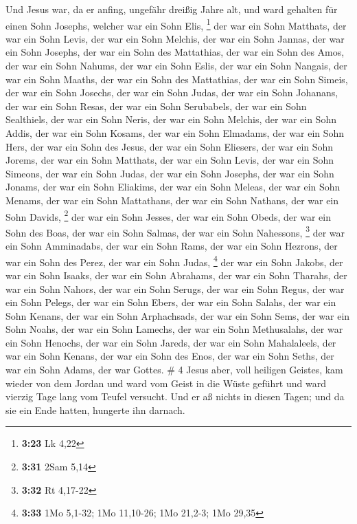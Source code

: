  Und Jesus war, da er anfing, ungefähr dreißig Jahre alt,
und ward gehalten für einen Sohn Josephs, welcher war ein Sohn Elis,
\footnote{\textbf{3:23} Lk 4,22}  der war ein Sohn
Matthats, der war ein Sohn Levis, der war ein Sohn Melchis, der war ein
Sohn Jannas, der war ein Sohn Josephs,  der war ein Sohn
des Mattathias, der war ein Sohn des Amos, der war ein Sohn Nahums, der
war ein Sohn Eslis, der war ein Sohn Nangais,  der war
ein Sohn Maaths, der war ein Sohn des Mattathias, der war ein Sohn
Simeis, der war ein Sohn Josechs, der war ein Sohn Judas,
 der war ein Sohn Johanans, der war ein Sohn Resas, der
war ein Sohn Serubabels, der war ein Sohn Sealthiels, der war ein Sohn
Neris,  der war ein Sohn Melchis, der war ein Sohn Addis,
der war ein Sohn Kosams, der war ein Sohn Elmadams, der war ein Sohn
Hers,  der war ein Sohn des Jesus, der war ein Sohn
Eliesers, der war ein Sohn Jorems, der war ein Sohn Matthats, der war
ein Sohn Levis,  der war ein Sohn Simeons, der war ein
Sohn Judas, der war ein Sohn Josephs, der war ein Sohn Jonams, der war
ein Sohn Eliakims,  der war ein Sohn Meleas, der war ein
Sohn Menams, der war ein Sohn Mattathans, der war ein Sohn Nathans, der
war ein Sohn Davids, \footnote{\textbf{3:31} 2Sam 5,14} 
der war ein Sohn Jesses, der war ein Sohn Obeds, der war ein Sohn des
Boas, der war ein Sohn Salmas, der war ein Sohn Nahessons, \footnote{\textbf{3:32}
  Rt 4,17-22}  der war ein Sohn Amminadabs, der war ein
Sohn Rams, der war ein Sohn Hezrons, der war ein Sohn des Perez, der war
ein Sohn Judas, \footnote{\textbf{3:33} 1Mo 5,1-32; 1Mo 11,10-26; 1Mo
  21,2-3; 1Mo 29,35}  der war ein Sohn Jakobs, der war
ein Sohn Isaaks, der war ein Sohn Abrahams, der war ein Sohn Tharahs,
der war ein Sohn Nahors,  der war ein Sohn Serugs, der
war ein Sohn Regus, der war ein Sohn Pelegs, der war ein Sohn Ebers, der
war ein Sohn Salahs,  der war ein Sohn Kenans, der war
ein Sohn Arphachsads, der war ein Sohn Sems, der war ein Sohn Noahs, der
war ein Sohn Lamechs,  der war ein Sohn Methusalahs, der
war ein Sohn Henochs, der war ein Sohn Jareds, der war ein Sohn
Mahalaleels, der war ein Sohn Kenans,  der war ein Sohn
des Enos, der war ein Sohn Seths, der war ein Sohn Adams, der war
Gottes. \# 4  Jesus aber, voll heiligen Geistes, kam
wieder von dem Jordan und ward vom Geist in die Wüste geführt
 und ward vierzig Tage lang vom Teufel versucht. Und er aß
nichts in diesen Tagen; und da sie ein Ende hatten, hungerte ihn
darnach.

